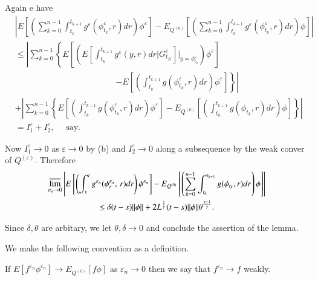Again e have
\begin{align*}
  & \left|E \left[\left(  \sum^{n-1}_{k=0} \int^{t_{k+1}}_{t_k} g^\varepsilon
    (\phi^\varepsilon_{t_k},  r)dr\right) \phi^\varepsilon \right] -
  E_{Q^{(0)}} \left[ \left( 
    \sum^{n-1}_{k=0} \int^{t_{k+1}}_{t_k} g^\varepsilon
    (\phi^\varepsilon_{t_k},  r)dr\right) \phi \right]\right| \\ 
  & \le \left| \sum^{n-1}_{k=0} \left\{ E \left[\left(E \left[\int^{t_{k+1}}_{t_k}
      g^\varepsilon(y,r)dr |G^\varepsilon_{t_K}\right]|_{y =
      \phi^\varepsilon_{t_k}} \right) \phi^\varepsilon
    \right]\right.\right.\\  
  & \hspace{5cm}\left.\left.-  E \left[\left( \int^{t_{k+1}}_{t_k}
    g(\phi^\varepsilon_{t_k},  r)dr\right) 
      \phi^\varepsilon \right] \right\} \right| \\ 
    & + \left| \sum^{n-1}_{k=0} \left\{ E \left[\left( \int^{t_{k+1}}_{t_k}
      g(\phi^\varepsilon_{t_k},  r)dr \right) \phi^{\varepsilon} \right]  -
    E_{Q^{(0)}} \left[\left( \int^{t_{k+1}}_{t_k} g(\phi_{t_k},  r)dr \right)
      \phi \right]  \right\} \right| \\ 
  & = I^\varepsilon_1 + I^\varepsilon_2,  
\quad \text{ say.} \tag{3.5.11}\label{c3:eq3.5.11}
\end{align*}

Now $I^\varepsilon_1 \rightarrow 0$ as $\varepsilon \to 0$ by (b) and
$I^\varepsilon_2 \rightarrow 0$ along a subsequence by the weak conver
of $Q^{(\varepsilon)}$. Therefore  
\begin{multline*}
  \varlimsup_{\varepsilon_n  \rightarrow 0} \left|E \left[ \left( \int^t_s
    g^{\varepsilon_n} (\phi^{\varepsilon_n}_r,\,  r)dr\right)
    \phi^{\varepsilon_n} \right] - E_{Q^{(0)}} 
    \left[\left(\sum^{n-1}_{k=0} \int^{t_{k+1}}_{t_k}
              g(\phi_{t_k},  r)dr\right) \phi \right]\right|\\ 
    \le \delta
            (t-s) || \phi || + 2 L^{\frac{1}{\gamma}} (t-s) || \phi ||
            \theta^{\frac{\gamma - 1}{\gamma}}.  
\end{multline*}

Since $\delta, \theta$ are arbitary, we  let $\theta, \delta
\rightarrow 0$ and conclude the assertion of the lemma. 

We make the following convention as a definition.

\setcounter{definition}{2}
\begin{definition}\label{c3:def3.5.3}\pageoriginale %
  If $E [f^{\varepsilon_n} \phi^{\varepsilon_n} ] \rightarrow E_{Q^{(0)}}[f
    \phi]$ as $\varepsilon_n \rightarrow 0$ then we say that
  $f^{\varepsilon_n} \rightarrow f$ weakly. 
\end{definition}

